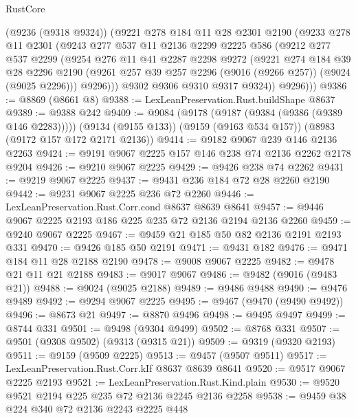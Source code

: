 \begin{lexlean}{RustCore}
\begin{coremodule}
        (@9236 (@9318 @9324))
        (@9221
          @278
          @184
          @11
          @28
          @2301
          @2190
          (@9233
            @278
            @11
            @2301
            (@9243
              @277
              @537
              @11
              @2136
              @2299
              @2225
              @586
              (@9212
                @277
                @537
                @2299
                (@9254
                  @276
                  @11
                  @41
                  @2287
                  @2298
                  @9272
                  (@9221
                    @274
                    @184
                    @39
                    @28
                    @2296
                    @2190
                    (@9261 @257 @39 @257 @2296 (@9016 (@9266 @257)) (@9024 (@9025 @2296)))
                    @9296)))
              @9302
              @9306
              @9310
              @9317
              @9324))
          @9296)))
@9386 := @8869 (@8661 @8)
@9388 := LexLeanPreservation.Rust.buildShape @8637
@9389 := @9388 @242
@9409 := @9084
    (@9178 (@9187 (@9384 (@9386 (@9389 @146 @2283)))))
    (@9134 (@9155 @133))
    (@9159 (@9163 @534 @157))
    (@8983 (@9172 @157 @172 @2171 @2136))
@9414 := @9182 @9067 @239 @146 @2136 @2263
@9424 := @9191 @9067 @2225 @157 @146 @238 @74 @2136 @2262 @2178 @9204
@9426 := @9210 @9067 @2225
@9429 := @9426 @238 @74 @2262
@9431 := @9219 @9067 @2225
@9437 := @9431 @236 @184 @72 @28 @2260 @2190
@9442 := @9231 @9067 @2225 @236 @72 @2260
@9446 := LexLeanPreservation.Rust.Corr.cond @8637 @8639 @8641
@9457 := @9446 @9067 @2225 @2193 @186 @225 @235 @72 @2136 @2194 @2136 @2260
@9459 := @9240 @9067 @2225
@9467 := @9459 @21 @185 @50 @82 @2136 @2191 @2193 @331
@9470 := @9426 @185 @50 @2191
@9471 := @9431 @182
@9476 := @9471 @184 @11 @28 @2188 @2190
@9478 := @9008 @9067 @2225
@9482 := @9478 @21 @11 @21 @2188
@9483 := @9017 @9067
@9486 := @9482 (@9016 (@9483 @21))
@9488 := @9024 (@9025 @2188)
@9489 := @9486 @9488
@9490 := @9476 @9489
@9492 := @9294 @9067 @2225
@9495 := @9467 (@9470 (@9490 @9492))
@9496 := @8673 @21
@9497 := @8870 @9496
@9498 := @9495 @9497
@9499 := @8744 @331
@9501 := @9498 (@9304 @9499)
@9502 := @8768 @331
@9507 := @9501 (@9308 @9502) (@9313 (@9315 @21))
@9509 := @9319 (@9320 @2193)
@9511 := @9159 (@9509 @2225)
@9513 := @9457 (@9507 @9511)
@9517 := LexLeanPreservation.Rust.Corr.kIf @8637 @8639 @8641
@9520 := @9517 @9067 @2225 @2193
@9521 := LexLeanPreservation.Rust.Kind.plain
@9530 := @9520 @9521 @2194 @225 @235 @72 @2136 @2245 @2136 @2258
@9538 := @9459 @38 @224 @340 @72 @2136 @2243 @2225 @448

\end{coremodule}
\end{lexlean}
